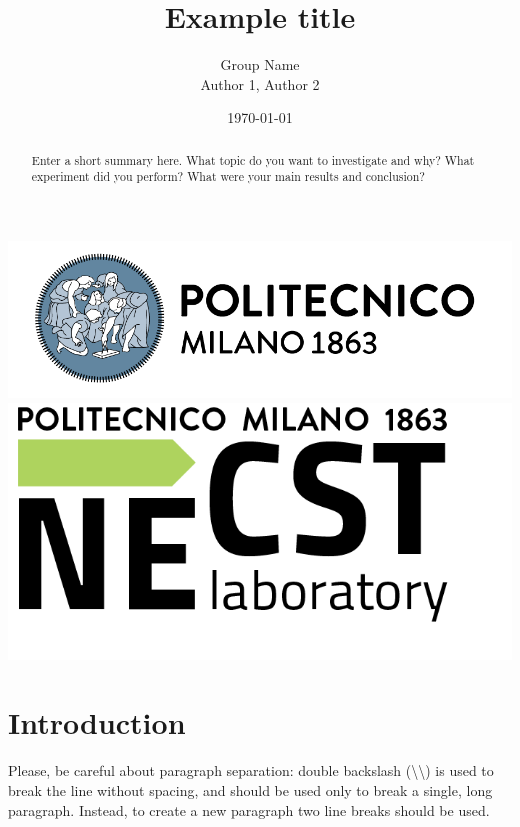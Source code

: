 \documentclass[12pt,oneside,a4paper]{article}
\title{\textbf{Example title}}
\author{Group Name\\Author 1, Author 2}
\date{\today}
\begin{document}
\begin{titlepage}
	\centering
	\clearpage
	\maketitle
	\thispagestyle{empty}
	\vspace*{1cm}

	\vfill
	\centering
	\includegraphics{logo_polimi.png}\includegraphics{logo_NECST.png}
\end{titlepage}


\begin{abstract}
Enter a short summary here. What topic do you want to investigate and why? What experiment did you perform? What were your main results and conclusion?
\end{abstract}

\section{Introduction} \label{sec:intro}
Please, be careful about paragraph separation: double backslash (\textbackslash\textbackslash) is used to break the line without spacing, and should be used only to break a single, long paragraph. Instead, to create a new paragraph two line breaks should be used.
\end{document}
